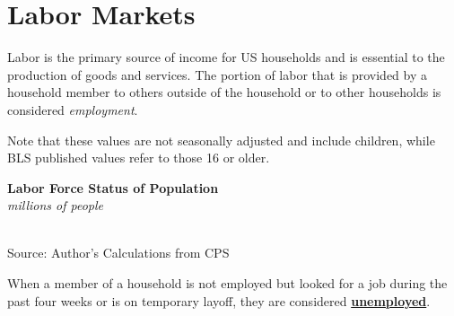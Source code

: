\documentclass{report}
\newcommand{\tbllink}[1]{\href{https://raw.githubusercontent.com/bdecon/US-chartbook/master/chartbook/data/#1}{\faTable}}
\newcommand{\ctsbar}[5]{
		\addplot[ybar stacked, bar width=#5, draw opacity=0, fill=#1] 
			table [x=#2, y=#3, col sep=comma]{#4};}
\newcommand{\dateaxisticks}{
		date coordinates in=x, axis line style={draw=none},
		xmax={2022-03-15},
		max space between ticks=40,	    
		xtick={{1990-01-01}, {1992-01-01}, {1994-01-01}, 
			{1996-01-01}, {1998-01-01}, {2000-01-01}, 
			{2002-01-01}, {2004-01-01}, {2006-01-01},
			{2008-01-01}, {2010-01-01}, {2012-01-01}, {2014-01-01},
		    {2016-01-01}, {2018-01-01}, {2020-01-01}, {2022-01-01}, 
		    {2024-01-01}, {2026-01-01}},
		minor xtick={{1989-01-01}, {1991-01-01}, {1993-01-01},
			{1995-01-01}, {1997-01-01}, {1999-01-01}, 
			{2001-01-01}, {2003-01-01}, {2005-01-01}, {2007-01-01},
		    {2009-01-01}, {2011-01-01}, {2013-01-01}, {2015-01-01},
		    {2017-01-01}, {2019-01-01}, {2021-01-01}, {2023-01-01}, 
		    {2025-01-01}, {2027-01-01}},
		enlarge y limits={0.06}, enlarge x limits={0.01},
		}
\newcommand{\bbar}[2]{extra #1 ticks = {{#2}}, extra #1 tick labels = ,
		extra #1 tick style = {grid=major, grid style={thick, black!25}},}
\newcommand{\rbars}{
		\fill[color=black!10] (axis cs:{1990-07-01},\pgfkeysvalueof{/pgfplots/ymin}) rectangle 
			(axis cs:{1991-03-01}, \pgfkeysvalueof{/pgfplots/ymax});
		\fill[color=black!10] (axis cs:{2007-12-01},\pgfkeysvalueof{/pgfplots/ymin}) rectangle 
			(axis cs:{2009-07-01}, \pgfkeysvalueof{/pgfplots/ymax});
		\fill[color=black!10] (axis cs:{2001-03-01},\pgfkeysvalueof{/pgfplots/ymin}) rectangle 
			(axis cs:{2001-11-01}, \pgfkeysvalueof{/pgfplots/ymax});
		\fill[color=black!10] (axis cs:{2020-02-01},\pgfkeysvalueof{/pgfplots/ymin}) rectangle 
			(axis cs:{2020-05-01}, \pgfkeysvalueof{/pgfplots/ymax});}
\begin{document}
{\begin{minipage}{0.34\textwidth}
\section*{Labor Markets}
\vspace{-2mm}
\small Labor is the primary source of income for US households and is essential to the production of goods and services. The portion of labor that is provided by a household member to others outside of the household or to other households is considered \textit{employment}. 

 Note that these values are not seasonally adjusted and include children, while BLS published values refer to those 16 or older.
\end{minipage} \hspace{6mm}
\begin{minipage}{0.57\textwidth}
\normalsize \textbf{Labor Force Status of Population}\\
\footnotesize{\textit{millions of people}}\\
\hspace*{-3mm} \\
\footnotesize{Source: Author's Calculations from CPS} \hfill \tbllink{cps_lfs.csv}
\end{minipage}
\vspace{1mm}

\begin{minipage}{0.76\textwidth}
\small When a member of a household is not employed but looked for a job during the past four weeks or is on temporary layoff, they are considered \href{https://www.bls.gov/cps/cps_htgm.htm}{\textbf{unemployed}}. 


\end{minipage}}
\end{document}
